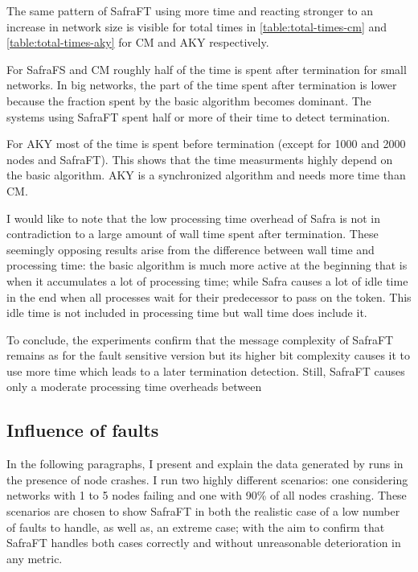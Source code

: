 The same pattern of SafraFT using more time and reacting stronger to an increase in network size is visible for total times in \cref{table:total-times-cm} and \cref{table:total-times-aky} for CM and AKY respectively.

For SafraFS and CM roughly half of the time is spent after termination for small networks.
In big networks, the part of the time spent after termination is lower because the fraction spent by the basic algorithm becomes dominant.
The systems using SafraFT spent half or more of their time to detect termination.

For AKY most of the time is spent before termination (except for 1000 and 2000 nodes and SafraFT).
This shows that the time measurments highly depend on the basic algorithm.
AKY is a synchronized algorithm and needs more time than CM.

I would like to note that the low processing time overhead of Safra is not in contradiction to a large amount of wall time spent after termination.
These seemingly opposing results arise from the difference between wall time and processing time: the basic algorithm is much more active at the beginning that is when it accumulates a lot of processing time; while Safra causes a lot of idle time in the end when all processes wait for their predecessor to pass on the token. 
This idle time is not included in processing time but wall time does include it.

To conclude, the experiments confirm that the message complexity of SafraFT remains as for the fault sensitive version but its higher bit complexity causes it to use more time which leads to a later termination detection.
Still, SafraFT causes only a moderate processing time overheads between %

\subsection{Influence of faults}
In the following paragraphs, I present and explain the data generated by runs in the presence of node crashes.
I run two highly different scenarios: one considering networks with 1 to 5 nodes failing and one with 90\% of all nodes crashing.
These scenarios are chosen to show SafraFT in both the realistic case of a low number of faults to handle, as well as, an extreme case; with the aim to confirm that SafraFT handles both cases correctly and without unreasonable deterioration in any metric.

